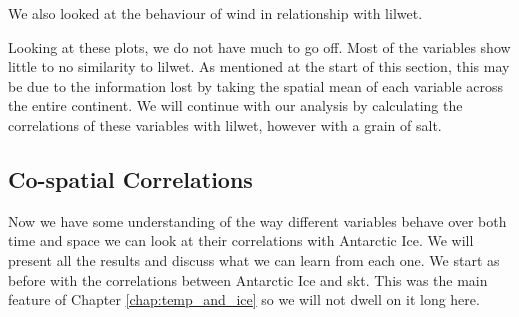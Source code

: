 \documentclass[../main.tex]{subfiles}
\begin{document}
We also looked at the behaviour of wind in relationship with \gls{lilwet}.

Looking at these plots, we do not have much to go off. Most of the variables show little to no similarity to \gls{lilwet}. As mentioned at the start of this section, this may be due to the information lost by taking the spatial mean of each variable across the entire continent. We will continue with our analysis by calculating the correlations of these variables with \gls{lilwet}, however with a grain of salt. 

\FloatBarrier
\subsection{Co-spatial Correlations}
Now we have some understanding of the way different variables behave over both time and space we can look at their correlations with Antarctic Ice. We will present all the results and discuss what we can learn from each one. We start as before with the correlations between Antarctic Ice and \gls{skt}. This was the main feature of Chapter \ref{chap:temp_and_ice} so we will not dwell on it long here. 
\end{document}
